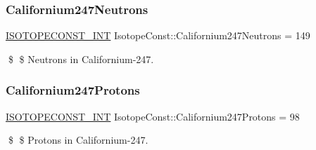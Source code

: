 \subsubsection{\texorpdfstring{Californium247\+Neutrons}{Californium247Neutrons}}
{\footnotesize\ttfamily \mbox{\hyperlink{group___isotope_const-_macros_ga5f18360b3e99483a35c32d789e62621c}{I\+S\+O\+T\+O\+P\+E\+C\+O\+N\+S\+T\+\_\+\+I\+NT}} Isotope\+Const\+::\+Californium247\+Neutrons = 149}

\$ \$ Neutrons in Californium-\/247. \mbox{\label{group___isotope_const-_californium-_cf247_ga778bf1b38cfa5337ee620b497ceb0435}} 
\subsubsection{\texorpdfstring{Californium247\+Protons}{Californium247Protons}}
{\footnotesize\ttfamily \mbox{\hyperlink{group___isotope_const-_macros_ga5f18360b3e99483a35c32d789e62621c}{I\+S\+O\+T\+O\+P\+E\+C\+O\+N\+S\+T\+\_\+\+I\+NT}} Isotope\+Const\+::\+Californium247\+Protons = 98}

\$ \$ Protons in Californium-\/247. 